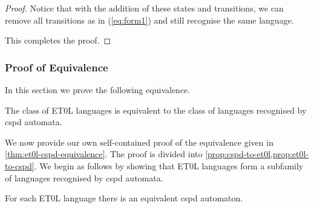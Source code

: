 \begin{proof}
	Notice that with the addition of these states and transitions, we can remove all transitions as in (\ref{eq:form1}) and still recognise the same language.
	
	This completes the proof.
\end{proof}

\subsubsection{Proof of Equivalence}\label{sec:proof-of-et0l-cspd-equivalence}

In this section we prove the following equivalence.

\begin{proposition}\label{thm:et0l-cspd-equivalence}
	The class of ET0L languages is equivalent to the class of languages recognised by cspd automata.
\end{proposition}

We now provide our own self-contained proof of the equivalence given in \cref{thm:et0l-cspd-equivalence}.
The proof is divided into \cref{prop:cspd-to-et0l,prop:et0l-to-cspd}.
We begin as follows by showing that ET0L languages form a subfamily of languages recognised by cspd automata.

\begin{lemma}\label{prop:et0l-to-cspd}
	For each ET0L language there is an equivalent cspd automaton.
\end{lemma}

